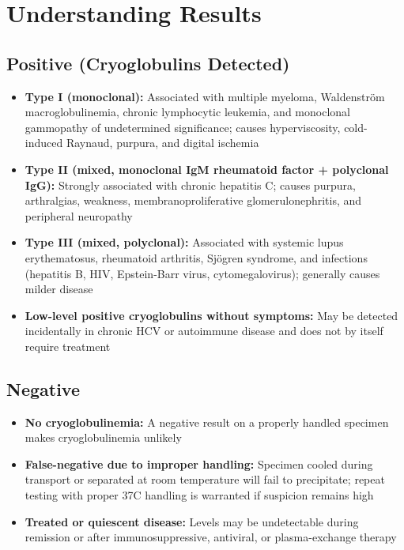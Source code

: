 \section*{Understanding Results}

\subsection*{Positive (Cryoglobulins Detected)}
\begin{itemize}
  \item \textbf{Type I (monoclonal):} Associated with multiple myeloma, Waldenstr\"om macroglobulinemia, chronic lymphocytic leukemia, and monoclonal gammopathy of undetermined significance; causes hyperviscosity, cold-induced Raynaud, purpura, and digital ischemia
  \item \textbf{Type II (mixed, monoclonal IgM rheumatoid factor + polyclonal IgG):} Strongly associated with chronic hepatitis C; causes purpura, arthralgias, weakness, membranoproliferative glomerulonephritis, and peripheral neuropathy
  \item \textbf{Type III (mixed, polyclonal):} Associated with systemic lupus erythematosus, rheumatoid arthritis, Sj\"ogren syndrome, and infections (hepatitis B, HIV, Epstein-Barr virus, cytomegalovirus); generally causes milder disease
  \item \textbf{Low-level positive cryoglobulins without symptoms:} May be detected incidentally in chronic HCV or autoimmune disease and does not by itself require treatment
\end{itemize}

\subsection*{Negative}
\begin{itemize}
  \item \textbf{No cryoglobulinemia:} A negative result on a properly handled specimen makes cryoglobulinemia unlikely
  \item \textbf{False-negative due to improper handling:} Specimen cooled during transport or separated at room temperature will fail to precipitate; repeat testing with proper 37\textdegree{}C handling is warranted if suspicion remains high
  \item \textbf{Treated or quiescent disease:} Levels may be undetectable during remission or after immunosuppressive, antiviral, or plasma-exchange therapy
\end{itemize}

